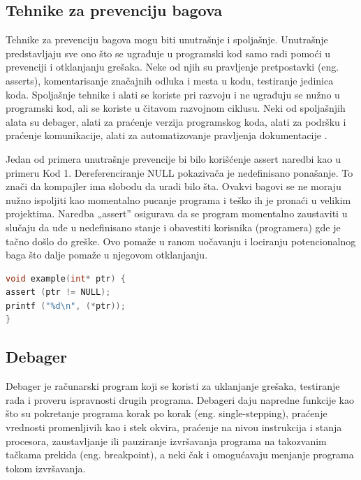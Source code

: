 \documentclass[a4paper]{article}
\begin{document}
\subsection{Tehnike za prevenciju bagova}
\label{subsec:Tehnike za prevenciju bagova}

Tehnike za prevenciju bagova mogu biti unutrašnje i spoljašnje. Unutrašnje predstavljaju sve ono što se ugrađuje u programski kod samo radi pomoći u prevenciji i otklanjanju grešaka. Neke od njih su pravljenje pretpostavki (eng. asserts), komentarisanje značajnih odluka i mesta u kodu, testiranje jedinica koda. Spoljašnje tehnike i alati se koriste pri razvoju i ne ugrađuju se nužno u programski kod, ali se koriste u čitavom razvojnom ciklusu. Neki od spoljašnjih alata su debager, alati za praćenje verzija programskog koda, alati za podršku i praćenje komunikacije, alati za automatizovanje pravljenja dokumentacije \cite{bagovi_smalkov}.  

Jedan od primera unutrašnje prevencije bi bilo korišćenje assert naredbi kao u primeru Kod 1. Dereferenciranje NULL pokazivača je nedefinisano ponašanje. To znači da kompajler ima slobodu da uradi bilo šta. Ovakvi bagovi se ne moraju nužno ispoljiti kao momentalno pucanje programa i teško ih je pronaći u velikim projektima. Naredba „assert” osigurava da se program momentalno zaustaviti u slučaju da uđe u nedefinisano stanje i obavestiti korisnika (programera) gde je tačno došlo do greške. Ovo pomaže u ranom uočavanju i lociranju potencionalnog baga što dalje pomaže u njegovom otklanjanju.\\

\begin{lstlisting}[language=C,caption=Primer upotrebe assert naredbe]
void example(int* ptr) {
assert (ptr != NULL);
printf ("%d\n", (*ptr));
}
\end{lstlisting}


\subsection{Debager}
\label{subsec:Debager}

Debager je računarski program koji se koristi za uklanjanje grešaka, testiranje rada i proveru ispravnosti drugih programa. Debageri daju napredne funkcije kao što su pokretanje programa korak po korak (eng. single-stepping), praćenje vrednosti promenljivih kao i stek okvira, praćenje na nivou instrukcija i stanja procesora, zaustavljanje ili pauziranje izvršavanja programa na takozvanim tačkama prekida (eng. breakpoint), a neki čak i omogućavaju menjanje programa tokom izvršavanja.
\end{document}

